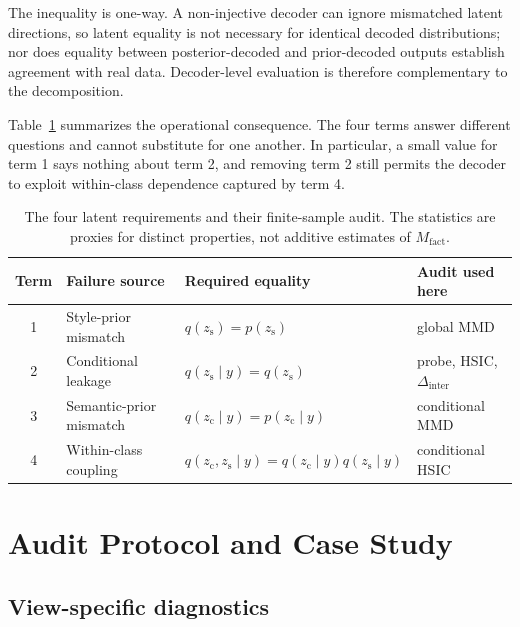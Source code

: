\documentclass{article}
\newcommand{\zc}{z_{\mathrm{c}}}
\newcommand{\zs}{z_{\mathrm{s}}}
\newcommand{\Dinter}{\Delta_{\mathrm{inter}}}
\begin{document}
The inequality is one-way.  A non-injective decoder can ignore mismatched
latent directions, so latent equality is not necessary for identical decoded
distributions; nor does equality between posterior-decoded and prior-decoded
outputs establish agreement with real data.  Decoder-level evaluation is
therefore complementary to the decomposition.

Table~\ref{tab:audit-map} summarizes the operational consequence.  The four
terms answer different questions and cannot substitute for one another.  In
particular, a small value for term 1 says nothing about term 2, and removing
term 2 still permits the decoder to exploit within-class dependence captured
by term 4.

\begin{table}[ht]
\caption{The four latent requirements and their finite-sample audit.  The
statistics are proxies for distinct properties, not additive estimates of
$M_{\mathrm{fact}}$.}
\label{tab:audit-map}
\centering
\small
\begin{tabular}{clll}
\toprule
Term & Failure source & Required equality & Audit used here \\
\midrule
1 & Style-prior mismatch & $q(\zs)=p(\zs)$ & global MMD \\
2 & Conditional leakage & $q(\zs\mid y)=q(\zs)$ & probe, HSIC, $\Dinter$ \\
3 & Semantic-prior mismatch & $q(\zc\mid y)=p(\zc\mid y)$ & conditional MMD \\
4 & Within-class coupling & $q(\zc,\zs\mid y)=q(\zc\mid y)q(\zs\mid y)$
& conditional HSIC \\
\bottomrule
\end{tabular}
\end{table}

\section{Audit Protocol and Case Study}
\label{sec:protocol}

\subsection{View-specific diagnostics}
\end{document}
